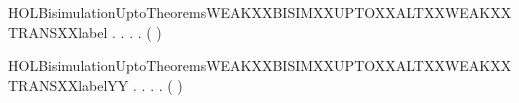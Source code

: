 \begin{SaveVerbatim}{HOLBisimulationUptoTheoremsWEAKXXBISIMXXUPTOXXALTXXWEAKXXTRANSXXlabel}
\HOLTokenTurnstile{} \HOLSymConst{\HOLTokenForall{}}.
         \HOLSymConst{\HOLTokenImp{}}
       \HOLSymConst{\HOLTokenForall{}} .
              \HOLSymConst{\HOLTokenImp{}}
           \HOLSymConst{\HOLTokenForall{}} .
                \HOLTokenWeakTransBegin{} \HOLTokenWeakTransEnd {} \HOLSymConst{\HOLTokenImp{}}
               \HOLSymConst{\HOLTokenExists{}}.
                    \HOLTokenWeakTransBegin{} \HOLTokenWeakTransEnd {} \HOLSymConst{\HOLTokenConj{}}
                   (    )  
\end{SaveVerbatim}
\newcommand{\HOLBisimulationUptoTheoremsWEAKXXBISIMXXUPTOXXALTXXWEAKXXTRANSXXlabel}{\UseVerbatim{HOLBisimulationUptoTheoremsWEAKXXBISIMXXUPTOXXALTXXWEAKXXTRANSXXlabel}}
\begin{SaveVerbatim}{HOLBisimulationUptoTheoremsWEAKXXBISIMXXUPTOXXALTXXWEAKXXTRANSXXlabelYY}
\HOLTokenTurnstile{} \HOLSymConst{\HOLTokenForall{}}.
         \HOLSymConst{\HOLTokenImp{}}
       \HOLSymConst{\HOLTokenForall{}} .
              \HOLSymConst{\HOLTokenImp{}}
           \HOLSymConst{\HOLTokenForall{}} .
                \HOLTokenWeakTransBegin{} \HOLTokenWeakTransEnd {} \HOLSymConst{\HOLTokenImp{}}
               \HOLSymConst{\HOLTokenExists{}}.
                    \HOLTokenWeakTransBegin{} \HOLTokenWeakTransEnd {} \HOLSymConst{\HOLTokenConj{}}
                   (    )  
\end{SaveVerbatim}
